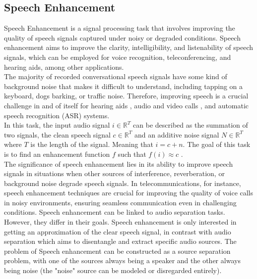 \subsection{Speech Enhancement}
Speech Enhancement is a signal processing task that involves improving the quality of speech signals captured under noisy or degraded conditions. Speech enhancement aims to improve the clarity, intelligibility, and listenability of speech signals, which can be employed for voice recognition, teleconferencing, and hearing aids, among other applications.\\ 
The majority of recorded conversational speech signals have some kind of background noise that makes it difficult to understand, including tapping on a keyboard, dogs barking, or traffic noise. Therefore, improving speech is a crucial challenge in and of itself for hearing aids \cite{reddy2018}, audio and video calls \cite{reddy2019}, and automatic speech recognition (ASR) systems.\\
In this task, the input audio signal $i \in \mathbb{R}^T$ can be described as the summation of two signals, the clean speech signal $c \in \mathbb{R}^T$ and an additive noise signal $N \in \mathbb{R}^T$ where $T$ is the length of the signal. Meaning that $i=c+n$. The goal of this task is to find an enhancement function $f$ such that $f(i) \approx c$ \cite{defossez2020}.\\
The significance of speech enhancement lies in its ability to improve speech signals in situations when other sources of interference, reverberation, or background noise degrade speech signals. In telecommunications, for instance, speech enhancement techniques are crucial for improving the quality of voice calls in noisy environments, ensuring seamless communication even in challenging conditions.
Speech enhancement can be linked to audio separation tasks. However, they differ in their goals. Speech enhancement is only interested in getting an approximation of the clear speech signal, in contrast with audio separation which aims to disentangle and extract specific audio sources. The problem of Speech enhancement can be constructed as a source separation problem, with one of the sources always being a speaker and the other always being noise (the "noise" source can be modeled or disregarded entirely).


